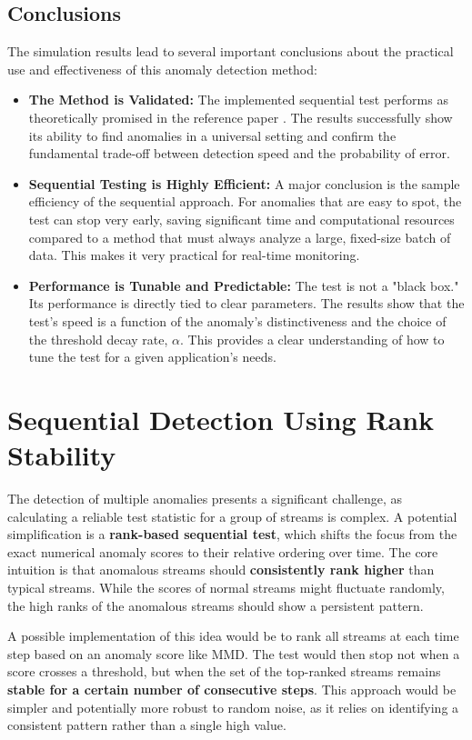 \subsection{Conclusions}
The simulation results lead to several important conclusions about the practical use and effectiveness of this anomaly detection method:
\begin{itemize}
    \item \textbf{The Method is Validated:} The implemented sequential test performs as theoretically promised in the reference paper \cite{sreenivasan2021sequential}. The results successfully show its ability to find anomalies in a universal setting and confirm the fundamental trade-off between detection speed and the probability of error.

    \item \textbf{Sequential Testing is Highly Efficient:} A major conclusion is the sample efficiency of the sequential approach. For anomalies that are easy to spot, the test can stop very early, saving significant time and computational resources compared to a method that must always analyze a large, fixed-size batch of data. This makes it very practical for real-time monitoring.

    \item \textbf{Performance is Tunable and Predictable:} The test is not a "black box." Its performance is directly tied to clear parameters. The results show that the test's speed is a function of the anomaly's distinctiveness and the choice of the threshold decay rate, $\alpha$. This provides a clear understanding of how to tune the test for a given application's needs.
\end{itemize}

\section{Sequential Detection Using Rank Stability}

The detection of multiple anomalies presents a significant challenge, as calculating a reliable test statistic for a group of streams is complex. A potential simplification is a \textbf{rank-based sequential test}, which shifts the focus from the exact numerical anomaly scores to their relative ordering over time. The core intuition is that anomalous streams should \textbf{consistently rank higher} than typical streams. While the scores of normal streams might fluctuate randomly, the high ranks of the anomalous streams should show a persistent pattern.

A possible implementation of this idea would be to rank all streams at each time step based on an anomaly score like MMD. The test would then stop not when a score crosses a threshold, but when the set of the top-ranked streams remains \textbf{stable for a certain number of consecutive steps}. This approach would be simpler and potentially more robust to random noise, as it relies on identifying a consistent pattern rather than a single high value.